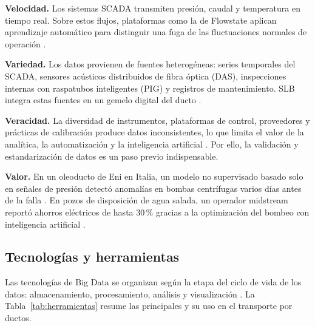 \documentclass[conference]{IEEEtran}
\begin{document}
\textbf{Velocidad.} Los sistemas SCADA transmiten presión, caudal y temperatura en tiempo real. Sobre estos flujos, plataformas como la de Flowstate aplican aprendizaje automático para distinguir una fuga de las fluctuaciones normales de operación \cite{flowstate}.

\textbf{Variedad.} Los datos provienen de fuentes heterogéneas: series temporales del SCADA, sensores acústicos distribuidos de fibra óptica (DAS), inspecciones internas con raspatubos inteligentes (PIG) y registros de mantenimiento. SLB integra estas fuentes en un gemelo digital del ducto \cite{slb}.

\textbf{Veracidad.} La diversidad de instrumentos, plataformas de control, proveedores y prácticas de calibración produce datos inconsistentes, lo que limita el valor de la analítica, la automatización y la inteligencia artificial \cite{ogj}. Por ello, la validación y estandarización de datos es un paso previo indispensable.

\textbf{Valor.} En un oleoducto de Eni en Italia, un modelo no supervisado basado solo en señales de presión detectó anomalías en bombas centrífugas varios días antes de la falla \cite{eni}. En pozos de disposición de agua salada, un operador midstream reportó ahorros eléctricos de hasta 30\,\% gracias a la optimización del bombeo con inteligencia artificial \cite{neuralix}.

\subsection{Tecnologías y herramientas}

Las tecnologías de Big Data se organizan según la etapa del ciclo de vida de los datos: almacenamiento, procesamiento, análisis y visualización \cite{sap, openwebinars}. La Tabla~\ref{tab:herramientas} resume las principales y su uso en el transporte por ductos.
\end{document}
